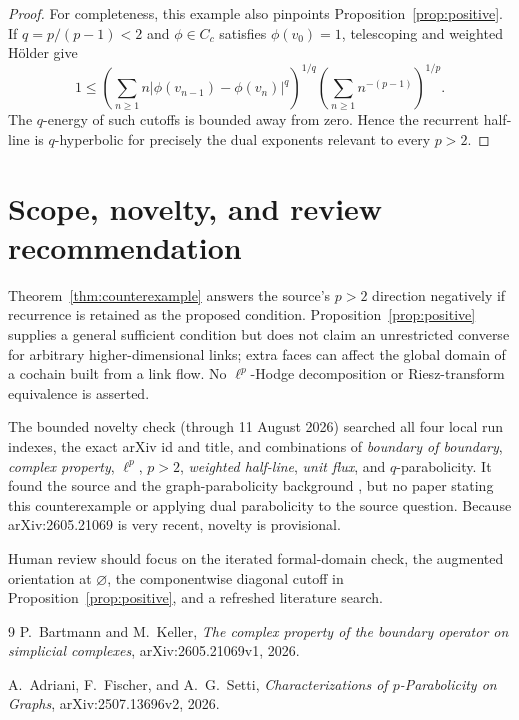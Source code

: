 \documentclass[11pt,a4paper]{article}
\begin{document}
\begin{proof}
For completeness, this example also pinpoints Proposition~\ref{prop:positive}. If $q=p/(p-1)<2$ and $\phi\in C_c$ satisfies $\phi(v_0)=1$, telescoping and weighted H\"older give
\[
 1
 \leq
 \left(\sum_{n\geq1}n|\phi(v_{n-1})-\phi(v_n)|^q\right)^{1/q}
 \left(\sum_{n\geq1}n^{-(p-1)}\right)^{1/p}.
\]
The $q$-energy of such cutoffs is bounded away from zero. Hence the recurrent half-line is $q$-hyperbolic for precisely the dual exponents relevant to every $p>2$.
\end{proof}

\section{Scope, novelty, and review recommendation}

Theorem~\ref{thm:counterexample} answers the source's $p>2$ direction negatively if recurrence is retained as the proposed condition. Proposition~\ref{prop:positive} supplies a general sufficient condition but does not claim an unrestricted converse for arbitrary higher-dimensional links; extra faces can affect the global domain of a cochain built from a link flow. No $\ell^p$-Hodge decomposition or Riesz-transform equivalence is asserted.

The bounded novelty check (through 11 August 2026) searched all four local run indexes, the exact arXiv id and title, and combinations of \emph{boundary of boundary}, \emph{complex property}, $\ell^p$, $p>2$, \emph{weighted half-line}, \emph{unit flux}, and $q$-parabolicity. It found the source and the graph-parabolicity background \cite{AFS}, but no paper stating this counterexample or applying dual parabolicity to the source question. Because arXiv:2605.21069 is very recent, novelty is provisional.

Human review should focus on the iterated formal-domain check, the augmented orientation at $\varnothing$, the componentwise diagonal cutoff in Proposition~\ref{prop:positive}, and a refreshed literature search.

\begin{thebibliography}{9}
P.~Bartmann and M.~Keller,
\emph{The complex property of the boundary operator on simplicial complexes},
arXiv:2605.21069v1, 2026.

A.~Adriani, F.~Fischer, and A.~G.~Setti,
\emph{Characterizations of $p$-Parabolicity on Graphs},
arXiv:2507.13696v2, 2026.
\end{thebibliography}
\end{document}
